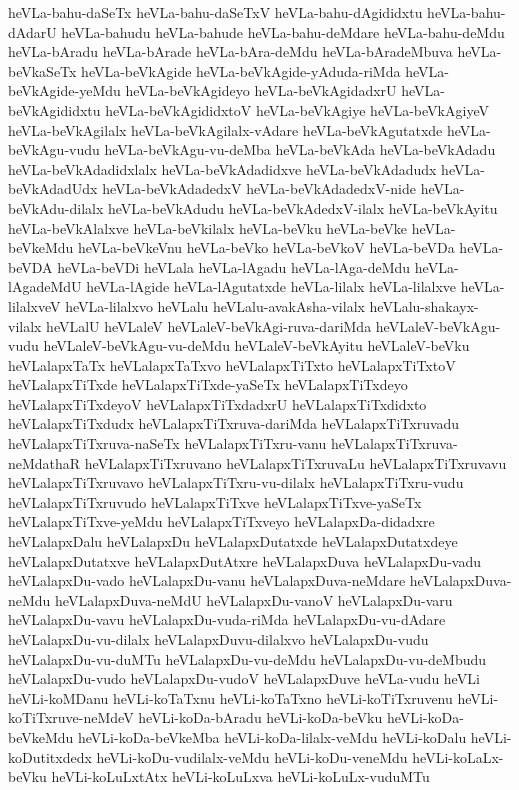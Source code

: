{heVLa-bahu-daSeTx
heVLa-bahu-daSeTxV
heVLa-bahu-dAgididxtu
heVLa-bahu-dAdarU
heVLa-bahudu
heVLa-bahude
heVLa-bahu-deMdare
heVLa-bahu-deMdu
heVLa-bAradu
heVLa-bArade
heVLa-bAra-deMdu
heVLa-bAradeMbuva
heVLa-beVkaSeTx
heVLa-beVkAgide
heVLa-beVkAgide-yAduda-riMda
heVLa-beVkAgide-yeMdu
heVLa-beVkAgideyo
heVLa-beVkAgidadxrU
heVLa-beVkAgididxtu
heVLa-beVkAgididxtoV
heVLa-beVkAgiye
heVLa-beVkAgiyeV
heVLa-beVkAgilalx
heVLa-beVkAgilalx-vAdare
heVLa-beVkAgutatxde
heVLa-beVkAgu-vudu
heVLa-beVkAgu-vu-deMba
heVLa-beVkAda
heVLa-beVkAdadu
heVLa-beVkAdadidxlalx
heVLa-beVkAdadidxve
heVLa-beVkAdadudx
heVLa-beVkAdadUdx
heVLa-beVkAdadedxV
heVLa-beVkAdadedxV-nide
heVLa-beVkAdu-dilalx
heVLa-beVkAdudu
heVLa-beVkAdedxV-ilalx
heVLa-beVkAyitu
heVLa-beVkAlalxve
heVLa-beVkilalx
heVLa-beVku
heVLa-beVke
heVLa-beVkeMdu
heVLa-beVkeVnu
heVLa-beVko
heVLa-beVkoV
heVLa-beVDa
heVLa-beVDA
heVLa-beVDi
heVLala
heVLa-lAgadu
heVLa-lAga-deMdu
heVLa-lAgadeMdU
heVLa-lAgide
heVLa-lAgutatxde
heVLa-lilalx
heVLa-lilalxve
heVLa-lilalxveV
heVLa-lilalxvo
heVLalu
heVLalu-avakAsha-vilalx
heVLalu-shakayx-vilalx
heVLalU
heVLaleV
heVLaleV-beVkAgi-ruva-dariMda
heVLaleV-beVkAgu-vudu
heVLaleV-beVkAgu-vu-deMdu
heVLaleV-beVkAyitu
heVLaleV-beVku
heVLalapxTaTx
heVLalapxTaTxvo
heVLalapxTiTxto
heVLalapxTiTxtoV
heVLalapxTiTxde
heVLalapxTiTxde-yaSeTx
heVLalapxTiTxdeyo
heVLalapxTiTxdeyoV
heVLalapxTiTxdadxrU
heVLalapxTiTxdidxto
heVLalapxTiTxdudx
heVLalapxTiTxruva-dariMda
heVLalapxTiTxruvadu
heVLalapxTiTxruva-naSeTx
heVLalapxTiTxru-vanu
heVLalapxTiTxruva-neMdathaR
heVLalapxTiTxruvano
heVLalapxTiTxruvaLu
heVLalapxTiTxruvavu
heVLalapxTiTxruvavo
heVLalapxTiTxru-vu-dilalx
heVLalapxTiTxru-vudu
heVLalapxTiTxruvudo
heVLalapxTiTxve
heVLalapxTiTxve-yaSeTx
heVLalapxTiTxve-yeMdu
heVLalapxTiTxveyo
heVLalapxDa-didadxre
heVLalapxDalu
heVLalapxDu
heVLalapxDutatxde
heVLalapxDutatxdeye
heVLalapxDutatxve
heVLalapxDutAtxre
heVLalapxDuva
heVLalapxDu-vadu
heVLalapxDu-vado
heVLalapxDu-vanu
heVLalapxDuva-neMdare
heVLalapxDuva-neMdu
heVLalapxDuva-neMdU
heVLalapxDu-vanoV
heVLalapxDu-varu
heVLalapxDu-vavu
heVLalapxDu-vuda-riMda
heVLalapxDu-vu-dAdare
heVLalapxDu-vu-dilalx
heVLalapxDuvu-dilalxvo
heVLalapxDu-vudu
heVLalapxDu-vu-duMTu
heVLalapxDu-vu-deMdu
heVLalapxDu-vu-deMbudu
heVLalapxDu-vudo
heVLalapxDu-vudoV
heVLalapxDuve
heVLa-vudu
heVLi
heVLi-koMDanu
heVLi-koTaTxnu
heVLi-koTaTxno
heVLi-koTiTxruvenu
heVLi-koTiTxruve-neMdeV
heVLi-koDa-bAradu
heVLi-koDa-beVku
heVLi-koDa-beVkeMdu
heVLi-koDa-beVkeMba
heVLi-koDa-lilalx-veMdu
heVLi-koDalu
heVLi-koDutitxdedx
heVLi-koDu-vudilalx-veMdu
heVLi-koDu-veneMdu
heVLi-koLaLx-beVku
heVLi-koLuLxtAtx
heVLi-koLuLxva
heVLi-koLuLx-vuduMTu
}
